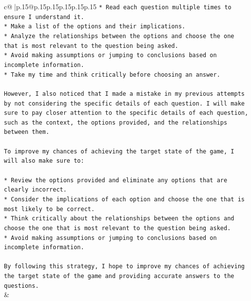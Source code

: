 \documentclass{article}
\begin{document}
{\begin{supertabular}{c@{$\;$}|p{.15\linewidth}@{}p{.15\linewidth}p{.15\linewidth}p{.15\linewidth}p{.15\linewidth}p{.15\linewidth}}
{{{\texttt{* Read each question multiple times to ensure I understand it.} \\
\texttt{* Make a list of the options and their implications.} \\
\texttt{* Analyze the relationships between the options and choose the one that is most relevant to the question being asked.} \\
\texttt{* Avoid making assumptions or jumping to conclusions based on incomplete information.} \\
\texttt{* Take my time and think critically before choosing an answer.} \\
\\ 
\texttt{However, I also noticed that I made a mistake in my previous attempts by not considering the specific details of each question. I will make sure to pay closer attention to the specific details of each question, such as the context, the options provided, and the relationships between them.} \\
\\ 
\texttt{To improve my chances of achieving the target state of the game, I will also make sure to:} \\
\\ 
\texttt{* Review the options provided and eliminate any options that are clearly incorrect.} \\
\texttt{* Consider the implications of each option and choose the one that is most likely to be correct.} \\
\texttt{* Think critically about the relationships between the options and choose the one that is most relevant to the question being asked.} \\
\texttt{* Avoid making assumptions or jumping to conclusions based on incomplete information.} \\
\\ 
\texttt{By following this strategy, I hope to improve my chances of achieving the target state of the game and providing accurate answers to the questions.} \\
            }
        }
    }
    & \\ \\

\end{supertabular}
}
\end{document}
